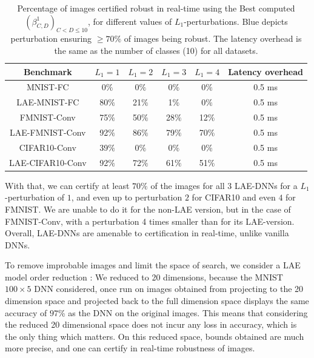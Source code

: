 \begin{table}[h!]
	\centering
	\begin{tabular}{|c|cccc|c|}\hline
		Benchmark & $L_1=1$ & $L_1=2$ & $L_1=3$ & $L_1=4$ & Latency overhead 
		
		\\\hline 
		MNIST-FC  & 0$\%$ & 0$\%$ & 0$\%$ & 0$\%$ & 0.5 ms
		\\
		
		LAE-MNIST-FC  & {\color{blue} 80$\%$}  & 21$\%$ & 1$\%$ & 0$\%$ & 0.5 ms
		\\ \hline 
		
 		FMNIST-Conv & 
		{\color{blue} 75$\%$}  & 50$\%$ & 28$\%$ &	12$\%$  & 0.5 ms
		\\

		LAE-FMNIST-Conv & 
		{\color{blue} 92$\%$} &	{\color{blue}86$\%$} &	{\color{blue}79$\%$} & {\color{blue} 70$\%$}  & 0.5 ms
		\\\hline
		
		CIFAR10-Conv  & 39$\%$ & 0$\%$ & 0$\%$ & 0$\%$ & 0.5 ms
		\\ 
		LAE-CIFAR10-Conv  & {\color{blue}92$\%$} & {\color{blue} 72$\%$} & 61$\%$ & 51$\%$ & 0.5 ms
		\\\hline
	\end{tabular}

	\caption{Percentage of images certified robust in real-time 
	using the Best computed $(\beta^{1}_{C,D})_{C < D \leq 10}$, 
	for different values of $L_1$-perturbations.
	{\color{blue} Blue} depicts perturbation ensuring 
	{\color{blue} $\geq 70\%$} of images being robust. The latency overhead is the same as the number of classes (10) for all datasets.}
    \label{table.cert}
\end{table}

With that, we can certify at least {\color{blue} $70\%$} of the images for all 3 LAE-DNNs for a $L_1$-perturbation of $1$, and even up to perturbation $2$ for CIFAR10 and even $4$ for FMNIST. We are unable to do it for the non-LAE version, but in the case of FMNIST-Conv, with a perturbation 4 times smaller than for its LAE-version. Overall, LAE-DNNs are amenable to certification in real-time, unlike vanilla DNNs.

\iffalse
To remove improbable images and limit the space of search, 
we consider a LAE model order reduction \cite{Paco}: We reduced to 20 dimensions, because the MNIST $100 \times 5$ DNN considered, once run on images obtained from projecting to the 20 dimension space and projected back to the full dimension space displays the same accuracy of $97$\% as the DNN on the original images. This means that considering the reduced 20 dimensional space
does not incur any loss in accuracy, which is the only thing which matters. On this reduced space, bounds obtained are much more precise, and one can certify in real-time robustness of images.





